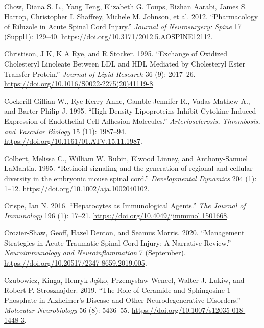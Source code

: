 \documentclass[9pt,lineno]{elife}
\newlength{\cslhangindent}
\newlength{\cslentryspacingunit} %
\newenvironment{CSLReferences}[2] %
 {%
  \setlength{\parindent}{0pt}
  \ifodd #1
  \let\oldpar\par
  \def\par{\hangindent=\cslhangindent\oldpar}
  \fi
  \setlength{\parskip}{#2\cslentryspacingunit}
 }%
 {}
\begin{document}
\begin{CSLReferences}{1}{0}
\leavevmode{}%
Chow, Diana S. L., Yang Teng, Elizabeth G. Toups, Bizhan Aarabi, James S. Harrop, Christopher I. Shaffrey, Michele M. Johnson, et al. 2012. {``Pharmacology of Riluzole in Acute Spinal Cord Injury.''} \emph{Journal of Neurosurgery: Spine} 17 (Suppl1): 129--40. \url{https://doi.org/10.3171/2012.5.AOSPINE12112}.

\leavevmode{}%
Christison, J K, K A Rye, and R Stocker. 1995. {``Exchange of Oxidized Cholesteryl Linoleate Between {LDL} and {HDL} Mediated by Cholesteryl Ester Transfer Protein.''} \emph{Journal of Lipid Research} 36 (9): 2017--26. \url{https://doi.org/10.1016/S0022-2275(20)41119-8}.

\leavevmode{}%
Cockerill Gillian W., Rye Kerry-Anne, Gamble Jennifer R., Vadas Mathew A., and Barter Philip J. 1995. {``High-{Density Lipoproteins Inhibit Cytokine-Induced Expression} of {Endothelial Cell Adhesion Molecules}.''} \emph{Arteriosclerosis, Thrombosis, and Vascular Biology} 15 (11): 1987--94. \url{https://doi.org/10.1161/01.ATV.15.11.1987}.

\leavevmode{}%
Colbert, Melissa C., William W. Rubin, Elwood Linney, and Anthony-Samuel LaMantia. 1995. {``{Retinoid signaling and the generation of regional and cellular diversity in the embryonic mouse spinal cord}.''} \emph{Developmental Dynamics} 204 (1): 1--12. \url{https://doi.org/10.1002/aja.1002040102}.

\leavevmode{}%
Crispe, Ian N. 2016. {``Hepatocytes as {Immunological Agents}.''} \emph{The Journal of Immunology} 196 (1): 17--21. \url{https://doi.org/10.4049/jimmunol.1501668}.

\leavevmode{}%
Crozier-Shaw, Geoff, Hazel Denton, and Seamus Morris. 2020. {``Management Strategies in Acute Traumatic Spinal Cord Injury: A Narrative Review.''} \emph{Neuroimmunology and Neuroinflammation} 7 (September). \url{https://doi.org/10.20517/2347-8659.2019.005}.

\leavevmode{}%
Czubowicz, Kinga, Henryk Jęśko, Przemysław Wencel, Walter J. Lukiw, and Robert P. Strosznajder. 2019. {``The {Role} of {Ceramide} and {Sphingosine-1-Phosphate} in {Alzheimer}'s {Disease} and {Other Neurodegenerative Disorders}.''} \emph{Molecular Neurobiology} 56 (8): 5436--55. \url{https://doi.org/10.1007/s12035-018-1448-3}.


\end{CSLReferences}
\end{document}
